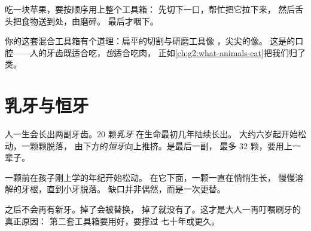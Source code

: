 \begin{example}\label{ex:g2:teeth-and-eating-well:apple}
吃一块苹果，要按顺序用上整个工具箱：
先切下一口，帮忙把它拉下来，
然后舌头把食物送到处，由磨碎。
最后才咽下。
\end{example}

\begin{remark}[想一想动物]\label{rem:g2:teeth-and-eating-well:animals}
你的这套混合工具箱有个道理：扁平的切割与研磨工具像
，尖尖的像。
这是的口腔——人的牙齿既适合吃，\emph{也}适合吃肉，
正如\cref{ch:g2:what-animals-eat}把我们归了类。
\end{remark}

\section{乳牙与恒牙}

\begin{proposition}[一生两副牙齿]\label{prop:g2:teeth-and-eating-well:sets}
人一生会长出两副牙齿。$20$ 颗\emph{乳牙}
在生命最初几年陆续长出。
大约六岁起开始松动，一颗颗脱落，
由下方的\emph{恒牙}向上推挤。是最后一副，
最多 $32$ 颗，要用上一辈子。
\end{proposition}
\admitted

\begin{example}[松动的门齿]\label{ex:g2:teeth-and-eating-well:wobbly}
一颗前在孩子刚上学的年纪开始松动。
在它下面，一颗一直在悄悄生长，
慢慢溶解的牙根，直到小牙脱落。
缺口并非偶然，而是一次更替。
\end{example}

\begin{remark}[没有第三副牙]\label{rem:g2:teeth-and-eating-well:nothird}
之后不会再有新牙。掉了会被替换，
掉了就没有了。这才是大人一再叮嘱刷牙的真正原因：
第二套工具箱要用好，要撑过
七十年或更久。
\end{remark}

